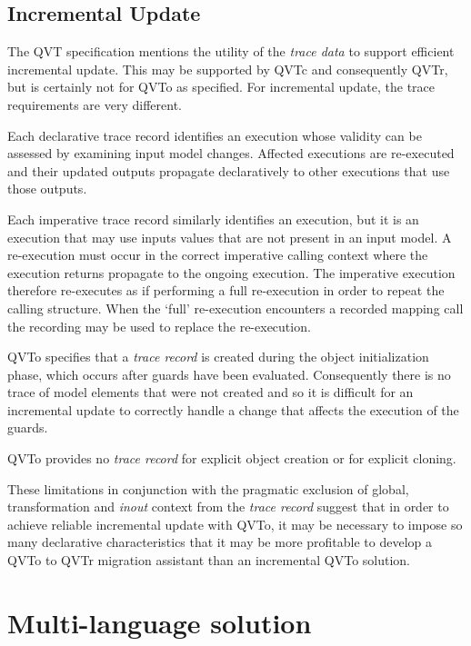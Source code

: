 \documentclass[runningheads,a4paper]{llncs}
\begin{document}
\subsection{Incremental Update}

The QVT specification mentions the utility of the \emph{trace data} to support efficient incremental update. This may be supported by QVTc and consequently QVTr, but is certainly not for QVTo as specified. For incremental update, the trace requirements are very different.

Each declarative trace record identifies an execution whose validity can be assessed by examining input model changes. Affected executions are re-executed and their updated outputs propagate declaratively to other executions that use those outputs.

 Each imperative trace record similarly identifies an execution, but it is an execution that may use inputs values that are not present in an input model. A re-execution must occur in the correct imperative calling context where the execution returns propagate to the ongoing execution. The imperative execution therefore re-executes as if performing a full re-execution in order to repeat the calling structure. When the `full' re-execution encounters a recorded mapping call the recording may be used to replace the re-execution. 

QVTo specifies that a \emph{trace record} is created during the object initialization phase, which occurs after guards have been evaluated. Consequently there is no trace of model elements that were not created and so it is difficult for an incremental update to correctly handle a change that affects the execution of the guards.

QVTo provides no \emph{trace record} for explicit object creation or for explicit cloning.

These limitations in conjunction with the pragmatic exclusion of global, transformation and \emph{inout} context from the \emph{trace record} suggest that in order to achieve reliable incremental update with QVTo, it may be necessary to impose so many declarative characteristics that it may be more profitable to develop a QVTo to QVTr migration assistant than an incremental QVTo solution. 

\section{Multi-language solution}\label{solution}
\end{document}
